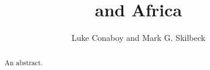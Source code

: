 \documentclass[12pt]{article}
\title{\elnino{} and Africa}
\author{Luke Conaboy and Mark G. Skilbeck}
\date{}
\begin{document}
\maketitle

\begin{abstract}
  An abstract.
\end{abstract}

\begin{multicols}{2}




\end{multicols}

\cite{*}

\end{document}

